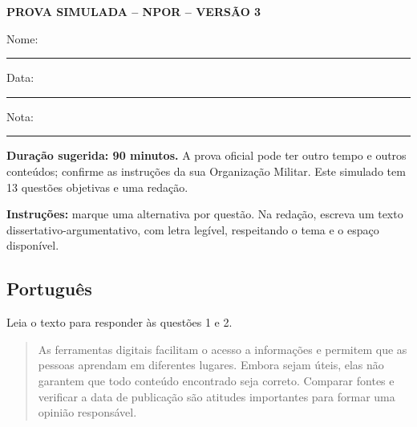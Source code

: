 \documentclass[12pt,a4paper]{article}
\begin{document}
\begin{center}
  {\Large\bfseries PROVA SIMULADA -- NPOR -- VERSÃO 3}\par
  \vspace{0.4cm}
  Nome: \rule{9cm}{0.4pt}\par\vspace{0.3cm}
  Data: \rule{4cm}{0.4pt}\hfill Nota: \rule{3cm}{0.4pt}
\end{center}

\noindent\textbf{Duração sugerida: 90 minutos.} A prova oficial pode ter outro tempo e outros conteúdos; confirme as instruções da sua Organização Militar. Este simulado tem 13 questões objetivas e uma redação.

\medskip
\noindent\textbf{Instruções:} marque uma alternativa por questão. Na redação, escreva um texto dissertativo-argumentativo, com letra legível, respeitando o tema e o espaço disponível.

\subsection*{Português}
Leia o texto para responder às questões 1 e 2.

\begin{quote}
As ferramentas digitais facilitam o acesso a informações e permitem que as pessoas aprendam em diferentes lugares. Embora sejam úteis, elas não garantem que todo conteúdo encontrado seja correto. Comparar fontes e verificar a data de publicação são atitudes importantes para formar uma opinião responsável.
\end{quote}
\end{document}
